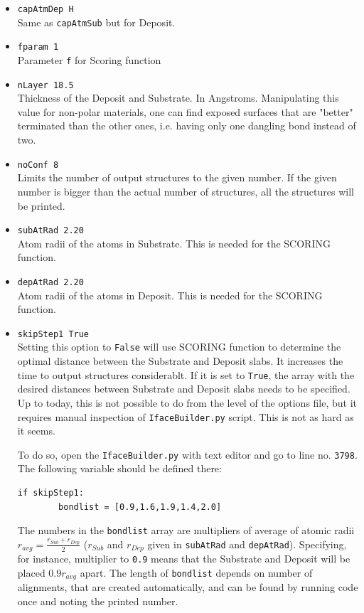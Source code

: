\documentclass[a4paper,12pt,oneside]{article}
\begin{document}
\begin{itemize}
\item{\texttt{capAtmDep     H}}\\
Same as \texttt{capAtmSub} but for Deposit.

\item{\texttt{fparam   1}}\\
Parameter \texttt{f} for Scoring function

\item{\texttt{nLayer  18.5}}\\
Thickness of the Deposit and Substrate. In Angstroms. 
Manipulating this value for non-polar materials, one can find exposed 
surfaces that are "better"
terminated than the other ones, i.e. having only one dangling bond instead of two. 

\item{\texttt{noConf   8}}\\
Limits the number of output structures to the given number. 
If the given number is bigger than the actual number of structures, all the 
structures will be printed. 

\item{\texttt{subAtRad   2.20}}\\
Atom radii of the atoms in Substrate. This is needed for the SCORING function. 

\item{\texttt{depAtRad   2.20}}\\
Atom radii of the atoms in Deposit. This is needed for the SCORING function.

\item{\texttt{skipStep1  True}}\\
Setting this option to \texttt{False} will use SCORING function to determine the
optimal distance between the Substrate and Deposit slabs. It increases the time
to output structures considerablt. 
If it is set to \texttt{True}, the array with the desired distances between
Substrate and Deposit slabs needs to be specified. Up to today, this is not
possible to do from the level of the options file, but it requires manual
inspection of \texttt{IfaceBuilder.py} script. This is not as hard as it seems.

To do so, open the \texttt{IfaceBuilder.py} with text editor and go to line no.
\texttt{3798}. The following variable should be defined there:
\begin{verbatim}
if skipStep1:
        bondlist = [0.9,1.6,1.9,1.4,2.0]
\end{verbatim}

\noindent
The numbers in the \texttt{bondlist} array are multipliers of average of atomic
radii $r_{avg}=\frac{r_{Sub}+r_{Dep}}{2}$ ($r_{Sub}$ and $r_{Dep}$ given in
\texttt{subAtRad} and \texttt{depAtRad}). Specifying, for instance, multiplier
to \texttt{0.9} means that the Substrate and Deposit will be placed $0.9r_{avg}$
apart. The length of \texttt{bondlist} depends on number of alignments, that 
are created automatically, and can be found by running code once and noting the
printed number.


\end{itemize}
\end{document}

